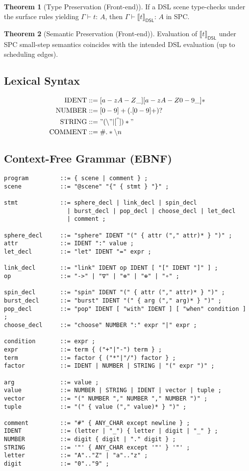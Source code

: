 \documentclass[12pt]{article}
\newcommand{\Entails}{\vdash}
\newcommand{\Types}{:\,}
\newcommand{\Ctx}{\Gamma}
\newcommand{\Interp}[1]{\llbracket #1 \rrbracket}
\theoremstyle{definition}
\newtheorem{theorem}{Theorem}
\begin{document}
\begin{theorem}[Type Preservation (Front-end)]
If a DSL scene type-checks under the surface rules yielding $\Ctx \Entails t \Types A$, then $\Ctx \Entails \Interp{t}_{\mathsf{DSL}} \Types A$ in SPC.
\end{theorem}

\begin{theorem}[Semantic Preservation (Front-end)]
Evaluation of $\Interp{t}_{\mathsf{DSL}}$ under SPC small-step semantics coincides with the intended DSL evaluation (up to scheduling edges).
\end{theorem}

\subsection{Lexical Syntax}
\begin{align*}
\text{IDENT} &::= [a-zA-Z\_][a-zA-Z0-9\_]* \\
\text{NUMBER} &::= [0-9]+ (\text{.} [0-9]+)? \\
\text{STRING} &::= " (\backslash" | [^"])* " \\
\text{COMMENT} &::= \# .* \backslash n
\end{align*}

\subsection{Context-Free Grammar (EBNF)}
\begin{verbatim}
program         ::= { scene | comment } ;
scene           ::= "@scene" "{" { stmt } "}" ;

stmt            ::= sphere_decl | link_decl | spin_decl
                  | burst_decl | pop_decl | choose_decl | let_decl
                  | comment ;

sphere_decl     ::= "sphere" IDENT "(" { attr ("," attr)* } ")" ;
attr            ::= IDENT ":" value ;
let_decl        ::= "let" IDENT "=" expr ;

link_decl       ::= "link" IDENT op IDENT [ "[" IDENT "]" ] ;
op              ::= "->" | "∇" | "⊗" | "⊕" | "∘" ;

spin_decl       ::= "spin" IDENT "(" { attr ("," attr)* } ")" ;
burst_decl      ::= "burst" IDENT "(" { arg ("," arg)* } ")" ;
pop_decl        ::= "pop" IDENT [ "with" IDENT ] [ "when" condition ] ;
choose_decl     ::= "choose" NUMBER ":" expr "|" expr ;

condition       ::= expr ;
expr            ::= term { ("+"|"-") term } ;
term            ::= factor { ("*"|"/") factor } ;
factor          ::= IDENT | NUMBER | STRING | "(" expr ")" ;

arg             ::= value ;
value           ::= NUMBER | STRING | IDENT | vector | tuple ;
vector          ::= "(" NUMBER "," NUMBER "," NUMBER ")" ;
tuple           ::= "(" { value ("," value)* } ")" ;

comment         ::= "#" { ANY_CHAR except newline } ;
IDENT           ::= (letter | "_") { letter | digit | "_" } ;
NUMBER          ::= digit { digit | "." digit } ;
STRING          ::= '"' { ANY_CHAR except '"' } '"' ;
letter          ::= "A".."Z" | "a".."z" ;
digit           ::= "0".."9" ;
\end{verbatim}
\end{document}
